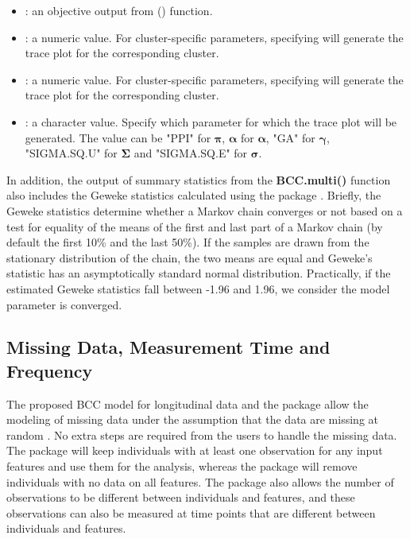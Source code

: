 \begin{itemize}
	\item {}: an objective output from () function.  
	\item {}: a numeric value. For cluster-specific parameters, specifying  will generate the trace plot for the corresponding cluster. 
	\item {}: a numeric value. For cluster-specific parameters, specifying  will generate the trace plot for the corresponding cluster. 
	\item {}:  a character value. Specify which parameter for which the trace plot will be generated. The value can be "PPI" for $\boldsymbol{\pi}$, $\boldsymbol{\alpha}$ for $\boldsymbol{\alpha}$, "GA" for $\boldsymbol{\gamma}$, "SIGMA.SQ.U" for $\boldsymbol{\Sigma}$ and "SIGMA.SQ.E" for  $\boldsymbol{\sigma}$.
\end{itemize}
In addition, the output of summary statistics from the \textbf{BCC.multi()} function also includes the Geweke statistics calculated using the  package \citep{Martyn2006}. Briefly, the Geweke statistics determine whether a Markov chain converges or not based on a test for equality of the means of the first and last part of a Markov chain (by default the first 10\% and the last 50\%). If the samples are drawn from the stationary distribution of the chain, the two means are equal and Geweke's statistic has an asymptotically standard normal distribution. Practically, if the estimated Geweke statistics fall between -1.96 and 1.96, we consider the model parameter is converged. 

\subsection{Missing Data, Measurement Time and Frequency}
The proposed BCC model for longitudinal data and the  package allow the modeling of missing data under the assumption that the data are missing at random \citep{Lu2022, Tan2022a}. No extra steps are required from the users to handle the missing data.  The package will keep individuals with at least one observation for any input features and use them for the analysis, whereas the package will remove individuals with no data on all features. The package also allows the number of observations to be different between individuals and features, and these observations can also be measured at time points that are different between individuals and features.


